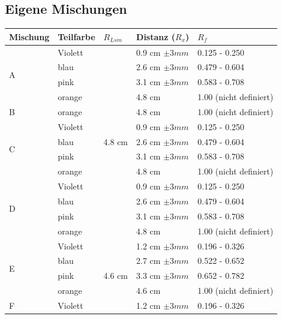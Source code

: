 \documentclass[11pt,paper=a4,final]{scrartcl}
\begin{document}
\subsection{Eigene Mischungen}
\begin{savenotes}
  \begin{table}[ht!]
    \centering
    \begin{tabular}{|l|l|l|l|l|}
      \hline
      \bf Mischung	& \bf Teilfarbe	& \bf \(R_{Lsm}\)		& \bf Distanz (\(R_x\))	& \(R_f\)		\\ \hline
      \multirow{4}{*}{A}
			& Violett	& \multirow{13}{*}{4.8 cm }	& 0.9 cm \(\pm 3 mm \)	& 0.125 - 0.250		\\
      			& blau		& 				& 2.6 cm \(\pm 3 mm \)	& 0.479 - 0.604		\\
      			& pink		&				& 3.1 cm \(\pm 3 mm \)	& 0.583 - 0.708		\\
      			& orange	&				& 4.8 cm 		& 1.00 (nicht definiert)\\ \cline{1-2} \cline{4-5}
       B		& orange	&				& 4.8 cm		& 1.00 (nicht definiert)\\ \cline{1-2} \cline{4-5}
      \multirow{4}{*}{C}
			& Violett	& 				& 0.9 cm \(\pm 3 mm \)	& 0.125 - 0.250		\\
      			& blau		& 				& 2.6 cm \(\pm 3 mm \)	& 0.479 - 0.604		\\
      			& pink		&				& 3.1 cm \(\pm 3 mm \)	& 0.583 - 0.708		\\
      			& orange	&				& 4.8 cm 		& 1.00 (nicht definiert)\\ \cline{1-2} \cline{4-5}
      \multirow{4}{*}{D}
			& Violett	&				& 0.9 cm \(\pm 3 mm \)	& 0.125 - 0.250		\\
      			& blau		& 				& 2.6 cm \(\pm 3 mm \)	& 0.479 - 0.604		\\
      			& pink		&				& 3.1 cm \(\pm 3 mm \)	& 0.583 - 0.708		\\
      			& orange	&				& 4.8 cm 		& 1.00 (nicht definiert)\\ \hline
      \multirow{4}{*}{E}
			& Violett	& \multirow{18}{*}{4.6 cm }	& 1.2 cm \(\pm 3 mm \)	& 0.196 - 0.326		\\
      			& blau		& 				& 2.7 cm \(\pm 3 mm \)	& 0.522 - 0.652		\\
      			& pink		&				& 3.3 cm \(\pm 3 mm \)	& 0.652 - 0.782		\\
			      & orange	&				& 4.6 cm 		& 1.00 (nicht definiert)\\ \cline{1-2} \cline{4-5}
      \multirow{4}{*}{F}
			& Violett	&				& 1.2 cm \(\pm 3 mm \)	& 0.196 - 0.326		\\

\end{tabular}
\end{table}
\end{savenotes}
\end{document}

